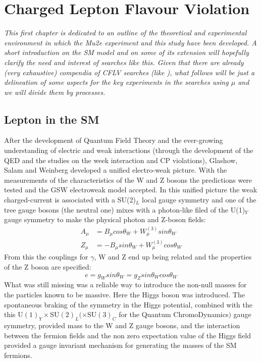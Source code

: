 \documentclass[12pt,a4paper,openright, oneside, titlepage]{book} %
\begin{document}
\chapter{Charged Lepton Flavour Violation}

{\itshape This first chapter is dedicated to an outline of the theoretical and experimental environment in which the Mu2e experiment and this study have been developed. A short introduction on the SM model and on some of its extension will hopefully clarify the need and interest of searches like this. Given that there are already (very exhaustive) compendia of CFLV searches (like \cite{signorelli} \cite{bob_cflv}), what follows will be just a delineation of some aspects for the key experiments in the searches using $\mu$ and we will divide them by processes.} 
\section{Lepton in the SM}
After the development of Quantum Field Theory and the ever-growing understanding of electric and weak interactions (through the development of the QED and the studies on the week interaction and CP violations), Glashow, Salam and Weinberg developed a unified electro-weak picture. With the measurements of the characteristics of the W and Z bosons the predictions were tested and the GSW electroweak model accepted. In this unified picture the weak charged-current is associated with a SU(2)$_L$ local gauge symmetry and one of the tree gauge bosons (the neutral one) mixes with a photon-like filed of the U(1)$_Y$ gauge symmetry to make the physical photon and Z-boson fields:
\begin{align*}
A_\mu &= B_\mu cos \theta_W + W_\mu^{(3)} sin \theta_W\\
Z_\mu &= - B_\mu sin \theta_W + W_\mu^{(3)} cos \theta_W
\end{align*}
From this the couplings for $\gamma$, W and Z end up being related and the properties of the Z boson are specified:
$$e=g_W sin \theta_W = g_Z sin \theta_W cos\theta_W$$
What was still missing was a reliable way to introduce the non-null masses for the particles known to be massive. Here the Higgs boson was introduced. The spontaneous braking of the symmetry in the Higgs potential, combined with the this U$(1)_Y \times $SU$(2)_L(\times $SU$(3)_C$ for the Quantum ChromoDynamics$)$ gauge symmetry, provided mass to the W and Z gauge bosons, and the interaction between the fermion fields and the non zero expectation value of the Higgs field provided a gauge invariant mechanism for generating the masses of the SM fermions.
\end{document}
